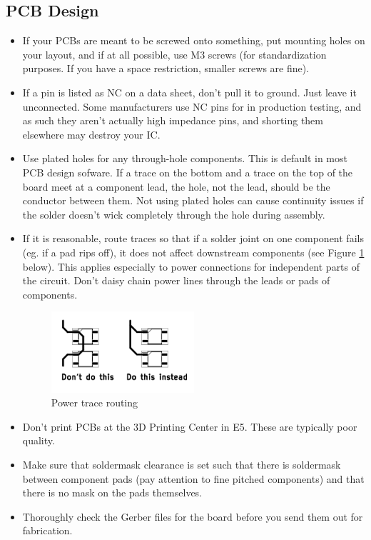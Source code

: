 \documentclass{article}
\begin{document}
\subsection{PCB Design}
\begin{itemize}
\item If your PCBs are meant to be screwed onto something, put mounting holes on your layout, and if at all possible, use M3 screws (for standardization purposes. If you have a space restriction, smaller screws are fine).
\item If a pin is listed as NC on a data sheet, don't pull it to ground. Just leave it unconnected. Some manufacturers use NC pins for in production testing, and as such they aren't actually high impedance pins, and shorting them elsewhere may destroy your IC.
\item Use plated holes for any through-hole components. This is default in most PCB design sofware. If a trace on the bottom and a trace on the top of the board meet at a component lead, the hole, not the lead, should be the conductor between them. Not using plated holes can cause continuity issues if the solder doesn't wick completely through the hole during assembly.
\item If it is reasonable, route traces so that if a solder joint on one component fails (eg. if a pad rips off), it does not affect downstream components (see Figure \ref{powertraces} below). This applies especially to power connections for independent parts of the circuit. Don't daisy chain power lines through the leads or pads of components.

\begin{figure}[h]
    \centering
    \includegraphics[height=3cm]{power_traces.png}
    \caption{Power trace routing}
    \label{powertraces}
\end{figure}

\item Don't print PCBs at the 3D Printing Center in E5. These are typically poor quality.
\item Make sure that soldermask clearance is set such that there is soldermask between component pads (pay attention to fine pitched components) and that there is no mask on the pads themselves.
\item Thoroughly check the Gerber files for the board before you send them out for fabrication.


\end{itemize}
\end{document}
